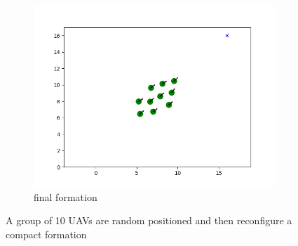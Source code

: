 \begin{figure}
\begin{subfigure}[b]{0.3\textwidth}
         \centering
         \includegraphics[width=\textwidth]{figures/reconfigure_3.png}
         \caption{final formation}
         \label{qw}
     \end{subfigure}
        \caption{A group of 10 UAVs are random positioned and then reconfigure a compact formation}
        \label{fig}
\end{figure}

